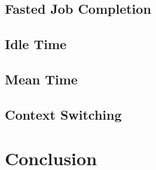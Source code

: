 \documentclass{acm_proc_article-sp}
\begin{document}
\subsection{Fasted Job Completion}

\subsection{Idle Time}

\subsection{Mean Time}

\subsection{Context Switching}

\section{Conclusion}
\end{document}

